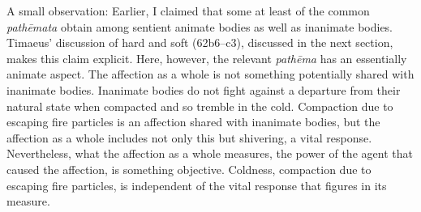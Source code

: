 A small observation: Earlier, I claimed that some at least of the common \emph{pathēmata} obtain among sentient animate bodies as well as inanimate bodies. Timaeus' discussion of hard and soft (62b6–c3), discussed in the next section, makes this claim explicit. Here, however, the relevant \emph{pathēma} has an essentially animate aspect. The affection as a whole is not something potentially shared with inanimate bodies. Inanimate bodies do not fight against a departure from their natural state when compacted and so tremble in the cold. Compaction due to escaping fire particles is an affection shared with inanimate bodies, but the affection as a whole includes not only this but shivering, a vital response. Nevertheless, what the affection as a whole measures, the power of the agent that caused the affection, is something objective. Coldness, compaction due to escaping fire particles, is independent of the vital response that figures in its measure.

